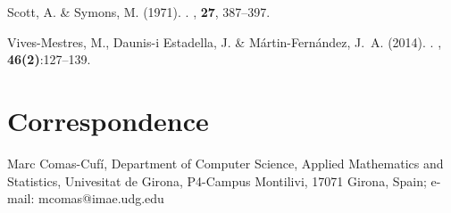\documentclass[12pt, a4paper]{article}
\theoremstyle{definition}
\begin{document}
\begin{thebibliography}{}
Scott, A. \& Symons, M. (1971).
.
, \textbf{27}, 387--397.

Vives-Mestres, M., Daunis-i Estadella, J. \& M\'{a}rtin-Fern\'{a}ndez, J.~A. (2014).
.
, \textbf{46(2)}:127--139.

\end{thebibliography}


\section*{Correspondence}
Marc Comas-Cufí, Department of Computer Science, Applied Mathematics and Statistics, Univesitat de Girona, P4-Campus Montilivi, 17071 Girona, Spain; e-mail: mcomas@imae.udg.edu
\end{document}
